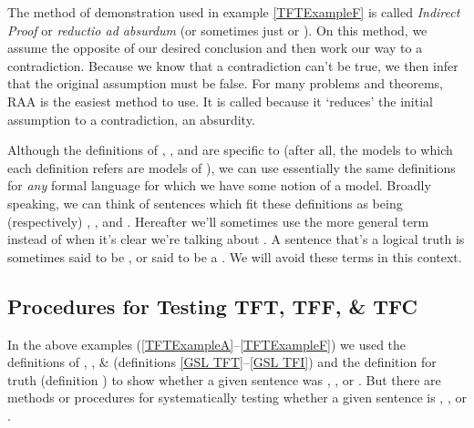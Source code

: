 The method of demonstration used in example \ref{TFTExampleF} is called \emph{Indirect Proof} or \emph{reductio ad absurdum} (or sometimes just  or ).  On this method, we assume the opposite of our desired conclusion and then work our way to a contradiction.  Because we know that a contradiction can't be true, we then infer that the original assumption must be false.  For many problems and theorems, RAA is the easiest method to use.  It is called  because it `reduces' the initial assumption to a contradiction, an absurdity.

Although the definitions of , , and  are specific to \GSL{} (after all, the models to which each definition refers are models of \GSL{}), we can use essentially the same definitions for \emph{any} formal language for which we have some notion of a model. 
Broadly speaking, we can think of sentences which fit these definitions as being (respectively) , , and . Hereafter we'll sometimes use the more general term  instead of  when it's clear we're talking about \GSL{}.
A sentence that's a logical truth is sometimes said to be , or said to be a . 
We will avoid these terms in this context.  

\subsection{Procedures for Testing TFT, TFF, \& TFC}\label{Proceduresfortesting}

In the above examples (\ref{TFTExampleA}--\ref{TFTExampleF}) we used the definitions of , , \&  (definitions \ref{GSL TFT}--\ref{GSL TFI}) and the definition for truth (definition ) to show whether a given \GSL{} sentence was , , or . 
But there are methods or procedures for systematically testing whether a given \GSL{} sentence is , , or . 

